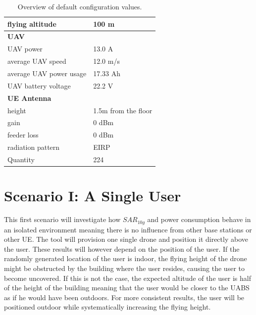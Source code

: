 \begin{table}[!htb]
\begin{tabular}[t]{ll}
        \hspace{3mm}  flying altitude                     & 100 m  \\
        \hline
        \multicolumn{2}{l}{\textbf{UAV}} \\
        \hline  
        \hspace{3mm}  UAV power                           & 13.0 A   \\
        \hspace{3mm}  average UAV speed                   & 12.0 m/s \\
        \hspace{3mm}  average UAV power usage             & 17.33 Ah    \\
        \hspace{3mm}  UAV battery voltage                 & 22.2 V \\
        \hline
        \multicolumn{2}{l}{\textbf{\acs{UE} Antenna}} \\
        \hline 
        \hspace{3mm} height                     & 1.5m from the floor       \\ 
        \hspace{3mm} gain                      & 0 dBm   \\ 
        \hspace{3mm} feeder loss               & 0 dBm   \\ 
        \hspace{3mm} radiation pattern         & \acs{EIRP}  \\
        \hspace{3mm} Quantity                   & 224  \\
        \toprule
\end{tabular}
\caption{Overview of default configuration values.}
\label{table:defaultconf}
\end{table}

\section{Scenario I: A Single User}
\label{sec:scenarios_s1}

This first scenario will investigate how $SAR_{10g}$ and power consumption behave in an isolated environment meaning there is no influence 
from other base stations or other \gls{UE}. The tool will provision one single drone and position it directly above the user.
These results will however depend on the position of the user. If the randomly generated location of the user is indoor, 
the flying height of the drone might be obstructed by the building where the user resides, causing the user to become uncovered. If this is not the case,
the expected altitude of the user is half of the height of the building meaning that the user would be closer to the \gls{UABS} as 
if he would have been outdoors. For more consistent results, the user will be positioned outdoor while systematically 
increasing the flying height. 

